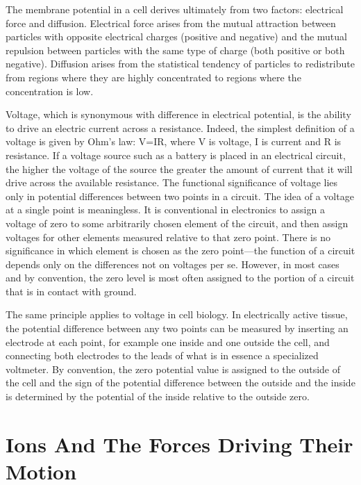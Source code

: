 The membrane potential in a cell derives ultimately from two factors: electrical force and diffusion. Electrical force arises from the mutual attraction between particles with opposite electrical charges (positive and negative) and the mutual repulsion between particles with the same type of charge (both positive or both negative). Diffusion arises from the statistical tendency of particles to redistribute from regions where they are highly concentrated to regions where the concentration is low.

Voltage, which is synonymous with difference in electrical potential, is the ability to drive an electric current across a resistance. Indeed, the simplest definition of a voltage is given by Ohm's law: V=IR, where V is voltage, I is current and R is resistance. If a voltage source such as a battery is placed in an electrical circuit, the higher the voltage of the source the greater the amount of current that it will drive across the available resistance. The functional significance of voltage lies only in potential differences between two points in a circuit. The idea of a voltage at a single point is meaningless. It is conventional in electronics to assign a voltage of zero to some arbitrarily chosen element of the circuit, and then assign voltages for other elements measured relative to that zero point. There is no significance in which element is chosen as the zero point---the function of a circuit depends only on the differences not on voltages per se. However, in most cases and by convention, the zero level is most often assigned to the portion of a circuit that is in contact with ground.

The same principle applies to voltage in cell biology. In electrically active tissue, the potential difference between any two points can be measured by inserting an electrode at each point, for example one inside and one outside the cell, and connecting both electrodes to the leads of what is in essence a specialized voltmeter. By convention, the zero potential value is assigned to the outside of the cell and the sign of the potential difference between the outside and the inside is determined by the potential of the inside relative to the outside zero.

\hypertarget{ions-and-the-forces-driving-their-motion}{%
\section{Ions And The Forces Driving Their Motion}\label{ions-and-the-forces-driving-their-motion}}

